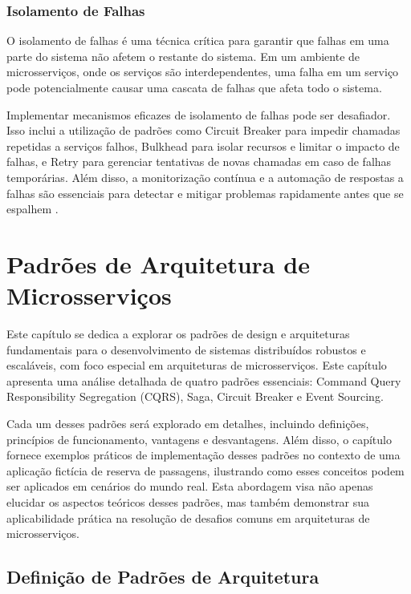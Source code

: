 \subsection{Isolamento de Falhas}

O isolamento de falhas é uma técnica crítica para garantir que falhas em uma parte do sistema não afetem o restante do sistema. Em um ambiente de microsserviços, onde os serviços são interdependentes, uma falha em um serviço pode potencialmente causar uma cascata de falhas que afeta todo o sistema.

Implementar mecanismos eficazes de isolamento de falhas pode ser desafiador. Isso inclui a utilização de padrões como Circuit Breaker para impedir chamadas repetidas a serviços falhos, Bulkhead para isolar recursos e limitar o impacto de falhas, e Retry para gerenciar tentativas de novas chamadas em caso de falhas temporárias. Além disso, a monitorização contínua e a automação de respostas a falhas são essenciais para detectar e mitigar problemas rapidamente antes que se espalhem \cite{nygard2007}.

\chapter{Padrões de Arquitetura de Microsserviços}

Este capítulo se dedica a explorar os padrões de design e arquiteturas fundamentais para o desenvolvimento de sistemas distribuídos robustos e escaláveis, com foco especial em arquiteturas de microsserviços. Este capítulo apresenta uma análise detalhada de quatro padrões essenciais: Command Query Responsibility Segregation (CQRS), Saga, Circuit Breaker e Event Sourcing.

Cada um desses padrões será explorado em detalhes, incluindo definições, princípios de funcionamento, vantagens e desvantagens. Além disso, o capítulo fornece exemplos práticos de implementação desses padrões no contexto de uma aplicação fictícia de reserva de passagens, ilustrando como esses conceitos podem ser aplicados em cenários do mundo real. Esta abordagem visa não apenas elucidar os aspectos teóricos desses padrões, mas também demonstrar sua aplicabilidade prática na resolução de desafios comuns em arquiteturas de microsserviços.

\section{Definição de Padrões de Arquitetura}

